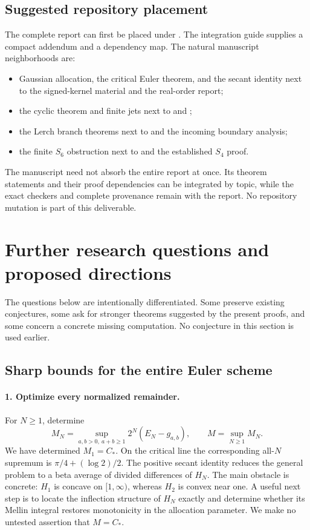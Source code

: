 \subsection{Suggested repository placement}

The complete report can first be placed under
.
The integration guide supplies a compact addendum and a dependency
map. The natural manuscript neighborhoods are:
\begin{itemize}
\item Gaussian allocation, the critical Euler theorem, and the secant
identity next to the signed-kernel material and the real-order report;
\item the cyclic theorem and finite jets next to
 and ;
\item the Lerch branch theorems next to
 and the incoming boundary analysis;
\item the finite $S_6$ obstruction next to
 and the established $S_4$ proof.
\end{itemize}
The manuscript need not absorb the entire report at once. Its theorem
statements and their proof dependencies can be integrated by topic,
while the exact checkers and complete provenance remain with the report.
No repository mutation is part of this deliverable.

\section{Further research questions and proposed directions}
\label{sec:research}

The questions below are intentionally differentiated. Some preserve
existing conjectures, some ask for stronger theorems suggested by the
present proofs, and some concern a concrete missing computation.
No conjecture in this section is used earlier.

\subsection{Sharp bounds for the entire Euler scheme}

\paragraph{1. Optimize every normalized remainder.}
For $N\ge1$, determine
\[
 M_N=\sup_{a,b>0,\ a+b\ge1}2^N(E_N-g_{a,b}),
 \qquad M=\sup_{N\ge1}M_N.
\]
We have determined $M_1=C_*$. On the critical line the corresponding
all-$N$ supremum is $\pi/4+(\log2)/2$. The positive secant identity
reduces the general problem to a beta average of divided differences
of $H_N$. The main obstacle is concrete: $H_1$ is concave on
$[1,\infty)$, whereas $H_2$ is convex near one. A useful next step is
to locate the inflection structure of $H_N$ exactly and determine
whether its Mellin integral restores monotonicity in the allocation
parameter. We make no untested assertion that $M=C_*$.

